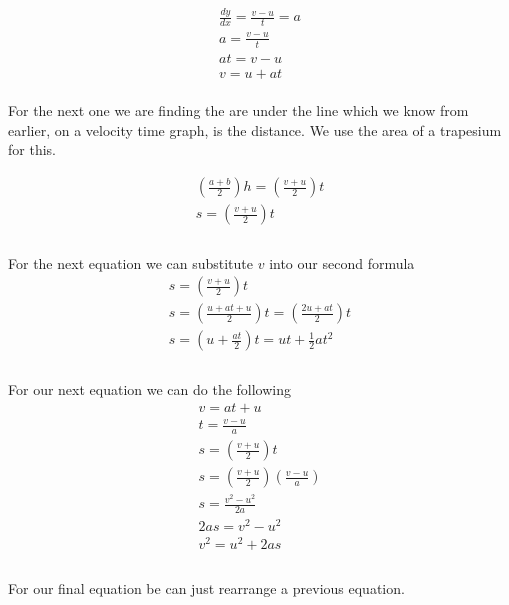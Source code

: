 \documentclass{article}
\begin{document}
\begin{gather}
	\frac{dy}{dx} = \frac{v - u}{t} = a \\
	a = \frac{v - u}{t} \\
	at = v - u \\
	v = u + at
\end{gather}
\\
For the next one we are finding the are under the line which we know
from earlier, on a velocity time graph, is the distance. We use the
area of a trapesium for this.

\begin{gather}
	\left ( \frac{a + b}{2} \right ) h = \left ( \frac{v + u}{2} \right )t \\
	s = \left ( \frac{v + u}{2} \right )t \\
\end{gather}
\\
For the next equation we can substitute $v$ into our second formula
\begin{gather}
	s = \left ( \frac{v + u}{2} \right )t \\
	s = \left ( \frac{u + at + u}{2} \right )t = \left ( \frac{2u + at}{2} \right )t \\
	s = \left ( u + \frac{at}{2} \right )t = ut + \frac{1}{2}at^2 \\
\end{gather}
\\
For our next equation we can do the following
\begin{gather}
	v = at + u \\
	t = \frac{v - u}{a} \\
	s = \left ( \frac{v + u}{2} \right )t \\
	s = \left ( \frac{v + u}{2} \right )\left (\frac{v - u}{a}\right ) \\
	s = \frac{v^2 - u^2}{2a} \\
	2as = v^2 - u^2 \\
	v^2 = u^2 + 2as \\
\end{gather}
\\
For our final equation be can just rearrange a previous equation.
\end{document}
